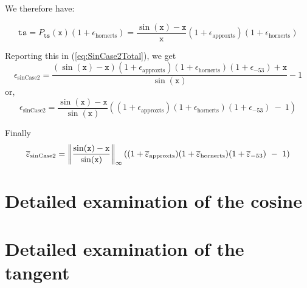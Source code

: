 We therefore have:

$$\mathtt{ts} = P_{\mathtt{ts}}(\mathtt{x})(1+\epsilon_{\mathrm{hornerts}}) = \frac{\sin(\mathtt{x})-\mathtt{x}}{\mathtt{x}}(1+\epsilon_{\mathrm{approxts}})(1+\epsilon_{\mathrm{hornerts}})$$

Reporting this in (\ref{eq:SinCase2Total}), we get 
\begin{equation*}
  \epsilon_{\mathrm{sinCase2}} = \frac{(\sin(\mathtt{x})-\mathtt{x})(1+\epsilon_{\mathrm{approxts}})(1+\epsilon_{\mathrm{hornerts}})(1+\epsilon_{-53}) + \mathtt{x}}{\sin(\mathtt{x})} -1
\end{equation*}
or,
\begin{equation*}
  \epsilon_{\mathrm{sinCase2}} =  \frac{\sin(\mathtt{x})-\mathtt{x}}{\sin(\mathtt{x})}\left((1+\epsilon_{\mathrm{approxts}})(1+\epsilon_{\mathrm{hornerts}})(1+\epsilon_{-53})\ -\ 1\right)
\end{equation*}

Finally
\begin{equation}
  \maxeps_{\mathrm{sinCase2}} =  \left\Vert\frac{\sin(\mathtt{x})-\mathtt{x}}{\sin(\mathtt{x})}\right\Vert_{\infty}((1+\maxeps_{\mathrm{approxts}})(1+\maxeps_{\mathrm{hornerts}})(1+\maxeps_{-53})\ -\ 1)
  \label{eq:SinCase2Total2}
\end{equation}
 



\section{Detailed examination of the cosine}
\section{Detailed examination of the tangent}

